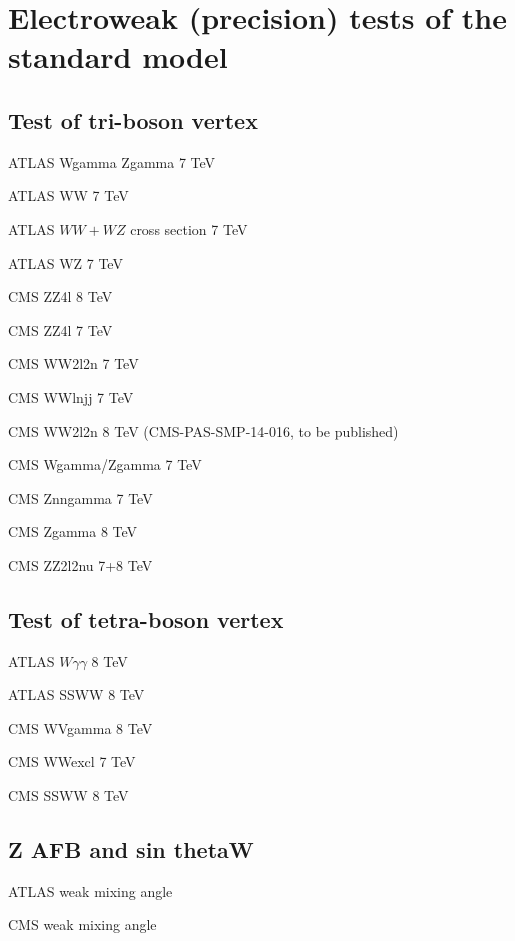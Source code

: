 \documentclass[12pt]{iopart}
\begin{document}
\section{Electroweak (precision) tests of the standard model}
\subsection{Test of tri-boson vertex}

ATLAS Wgamma Zgamma 7 TeV~\cite{Aad:2013izg}

ATLAS WW 7 TeV~\cite{ATLAS:2012mec}

ATLAS $WW+WZ$ cross section 7 TeV~\cite{Aad:2014mda}

ATLAS WZ 7 TeV~\cite{Aad:2012twa}

CMS ZZ4l 8 TeV~\cite{Khachatryan:2014dia}

CMS ZZ4l 7 TeV~\cite{Chatrchyan:2012sga}

CMS WW2l2n 7 TeV~\cite{Chatrchyan:2013yaa}

CMS WWlnjj 7 TeV~\cite{Chatrchyan:2012bd}

CMS WW2l2n 8 TeV (CMS-PAS-SMP-14-016, to be published)

CMS Wgamma/Zgamma 7 TeV~\cite{Chatrchyan:2013fya}

CMS Znngamma 7 TeV~\cite{Chatrchyan:2013nda}

CMS Zgamma 8 TeV~\cite{Khachatryan:2015kea}

CMS ZZ2l2nu 7+8 TeV~\cite{Khachatryan:2015pba}

\subsection{Test of tetra-boson vertex}

ATLAS $W\gamma\gamma$ 8 TeV~\cite{Aad:2015uqa}

ATLAS SSWW 8 TeV~\cite{Aad:2014zda}

CMS WVgamma 8 TeV~\cite{Chatrchyan:2014bza}

CMS WWexcl 7 TeV~\cite{Chatrchyan:2013foa}

CMS SSWW 8 TeV~\cite{Khachatryan:2014sta}

\subsection{Z AFB and sin thetaW}

ATLAS weak mixing angle~\cite{Aad:2015uau}

CMS weak mixing angle~\cite{Chatrchyan:2011ya}
\end{document}
